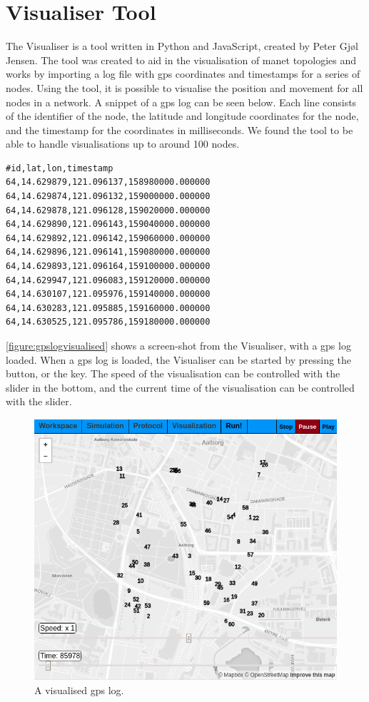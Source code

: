 \section{Visualiser Tool}\label{sec:visualiser}
The Visualiser is a tool written in Python and JavaScript, created by Peter Gjøl Jensen. The tool was created
to aid in the visualisation of \gls{manet} topologies and works by importing a log file with \acrshort{gps}
coordinates and timestamps for a series of nodes. Using the tool, it is possible to visualise the position and
movement for all nodes in a network. A snippet of a \acrshort{gps} log can be seen below. Each line consists
of the identifier of the node, the latitude and longitude coordinates for the node, and the timestamp for the
coordinates in milliseconds. We found the tool to be able to handle visualisations up to around 100 nodes.
%
\begin{verbatim}
#id,lat,lon,timestamp
64,14.629879,121.096137,158980000.000000
64,14.629874,121.096132,159000000.000000
64,14.629878,121.096128,159020000.000000
64,14.629890,121.096143,159040000.000000
64,14.629892,121.096142,159060000.000000
64,14.629896,121.096141,159080000.000000
64,14.629893,121.096164,159100000.000000
64,14.629947,121.096083,159120000.000000
64,14.630107,121.095976,159140000.000000
64,14.630283,121.095885,159160000.000000
64,14.630525,121.095786,159180000.000000
\end{verbatim}

\autoref{figure:gpslogvisualised} shows a screen-shot from the Visualiser, with a \acrshort{gps} log loaded.
When a \acrshort{gps} log is loaded, the Visualiser can be started by pressing the  button,
or the  key. The speed of the visualisation can be controlled with the 
slider in the bottom, and the current time of the visualisation can be controlled with the 
slider. 

\begin{figure}[H]
    \centering
    \includegraphics[width=\textwidth]{figures/visualiser/gpslog.png}
    \caption{A visualised \acrshort{gps} log.}
    \label{figure:gpslogvisualised}
\end{figure}


